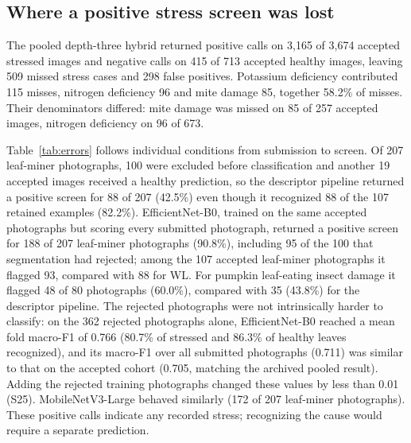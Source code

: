 \subsection{Where a positive stress screen was lost}
The pooled depth-three hybrid returned positive calls on 3,165 of 3,674 accepted stressed images and negative calls on 415 of 713 accepted healthy images, leaving 509 missed stress cases and 298 false positives. Potassium deficiency contributed 115 misses, nitrogen deficiency 96 and mite damage 85, together 58.2\% of misses. Their denominators differed: mite damage was missed on 85 of 257 accepted images, nitrogen deficiency on 96 of 673.

Table~\ref{tab:errors} follows individual conditions from submission to screen. Of 207 leaf-miner photographs, 100 were excluded before classification and another 19 accepted images received a healthy prediction, so the descriptor pipeline returned a positive screen for 88 of 207 (42.5\%) even though it recognized 88 of the 107 retained examples (82.2\%). EfficientNet-B0, trained on the same accepted photographs but scoring every submitted photograph, returned a positive screen for 188 of 207 leaf-miner photographs (90.8\%), including 95 of the 100 that segmentation had rejected; among the 107 accepted leaf-miner photographs it flagged 93, compared with 88 for WL. For pumpkin leaf-eating insect damage it flagged 48 of 80 photographs (60.0\%), compared with 35 (43.8\%) for the descriptor pipeline. The rejected photographs were not intrinsically harder to classify: on the 362 rejected photographs alone, EfficientNet-B0 reached a mean fold macro-F1 of 0.766 (80.7\% of stressed and 86.3\% of healthy leaves recognized), and its macro-F1 over all submitted photographs (0.711) was similar to that on the accepted cohort (0.705, matching the archived pooled result). Adding the rejected training photographs changed these values by less than 0.01 (S25). MobileNetV3-Large behaved similarly (172 of 207 leaf-miner photographs). These positive calls indicate any recorded stress; recognizing the cause would require a separate prediction.
\showpanel{\errtable}

